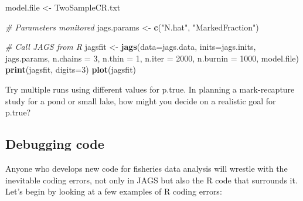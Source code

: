 \documentclass[
]{krantz}
\makeatletter
\newenvironment{Shaded}{\begin{snugshade}}{\end{snugshade}}
\newcommand{\AttributeTok}[1]{\textcolor[rgb]{0.27,0.27,0.27}{#1}}
\newcommand{\CommentTok}[1]{\textcolor[rgb]{0.37,0.37,0.37}{\textit{#1}}}
\newcommand{\DecValTok}[1]{\textcolor[rgb]{0.06,0.06,0.06}{#1}}
\newcommand{\FunctionTok}[1]{\textcolor[rgb]{0.27,0.27,0.27}{\textbf{#1}}}
\newcommand{\NormalTok}[1]{#1}
\newcommand{\OtherTok}[1]{\textcolor[rgb]{0.37,0.37,0.37}{#1}}
\newcommand{\StringTok}[1]{\textcolor[rgb]{0.5,0.5,0.5}{#1}}
\newenvironment{kframe}{%
\medskip{}
\setlength{\fboxsep}{.8em}
 \def\at@end@of@kframe{}%
 \ifinner\ifhmode%
  \def\at@end@of@kframe{\end{minipage}}%
  \begin{minipage}{\columnwidth}%
 \fi\fi%
 \def\FrameCommand##1{\hskip\@totalleftmargin \hskip-\fboxsep
 \colorbox{shadecolor}{##1}\hskip-\fboxsep
     \hskip-\linewidth \hskip-\@totalleftmargin \hskip\columnwidth}%
 \MakeFramed {\advance\hsize-\width
   \@totalleftmargin\z@ \linewidth\hsize
   \@setminipage}}%
 {\par\unskip\endMakeFramed%
 \at@end@of@kframe}
\renewenvironment{Shaded}{\begin{kframe}}{\end{kframe}}
\makeatother
\begin{document}
\begin{Shaded}
\begin{Highlighting}[]
\NormalTok{model.file }\OtherTok{\textless{}{-}} \StringTok{\textquotesingle{}TwoSampleCR.txt\textquotesingle{}}

\CommentTok{\# Parameters monitored}
\NormalTok{jags.params }\OtherTok{\textless{}{-}} \FunctionTok{c}\NormalTok{(}\StringTok{"N.hat"}\NormalTok{, }\StringTok{"MarkedFraction"}\NormalTok{)}

\CommentTok{\# Call JAGS from R}
\NormalTok{jagsfit }\OtherTok{\textless{}{-}} \FunctionTok{jags}\NormalTok{(}\AttributeTok{data=}\NormalTok{jags.data, }\AttributeTok{inits=}\NormalTok{jags.inits, jags.params,}
                \AttributeTok{n.chains =} \DecValTok{3}\NormalTok{, }\AttributeTok{n.thin =} \DecValTok{1}\NormalTok{, }\AttributeTok{n.iter =} \DecValTok{2000}\NormalTok{, }
                \AttributeTok{n.burnin =} \DecValTok{1000}\NormalTok{, model.file)}
\FunctionTok{print}\NormalTok{(jagsfit, }\AttributeTok{digits=}\DecValTok{3}\NormalTok{)}
\FunctionTok{plot}\NormalTok{(jagsfit)}
\end{Highlighting}
\end{Shaded}

Try multiple runs using different values for p.true. In planning a mark-recapture study for a pond or small lake, how might you decide on a realistic goal for p.true?

\hypertarget{Debug}{%
\subsection{Debugging code}\label{Debug}}

Anyone who develops new code for fisheries data analysis will wrestle with the inevitable coding errors, not only in JAGS but also the R code that surrounds it. Let's begin by looking at a few examples of R coding errors:
\end{document}
